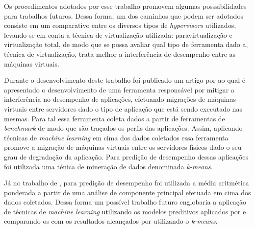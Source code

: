 Os procedimentos adotados por esse trabalho promovem algumas posssibilidades para trabalhos futuros. Dessa forma, um dos caminhos que podem ser adotados consiste em um comparativo entre os diversos tipos de \textit{hypervisors} utilizados, levando-se em conta a técnica de virtualização utilizada: paravirtualização e virtualização total, de modo que se possa avaliar qual tipo de ferramenta dado a, técnica de virtualização, trata melhor a interferência de desempenho entre as máquinas virtuais.

 Durante o desenvolvimento deste trabalho foi publicado um artigo por  ao qual é apresentado o desenvolvimento de uma ferramenta responsável por mitigar a interferência no desempenho de aplicações, efetuando migrações de máquinas virtuais entre servidores dado o tipo de aplicação que está sendo executado nas mesmas. Para tal essa ferramenta coleta dados a partir de ferramentas de \textit{benchmark} de modo que são traçados os perfis das aplicações. Assim, aplicando técnicas de \textit{machine learning} em cima dos dados coletados essa ferramenta promove a migração de máquinas virtuais entre os servidores físicos dado o seu grau de degradação da aplicação. Para predição de desempenho dessas aplicações foi utilizada uma ténica de mineração de dados denominada \textit{k-means}.
 
Já no trabalho de , para predição de desempenho foi utilizada a média aritmética ponderada a partir de uma análise de componente principal efetuada em cima dos dados coletados. Dessa forma um possível trabalho futuro englobaria a aplicação de técnicas de \textit{machine learning} utilizando os modelos preditivos aplicados por  e comparando os com os resultados alcançados por  utilizando o \textit{k-means}.





\


